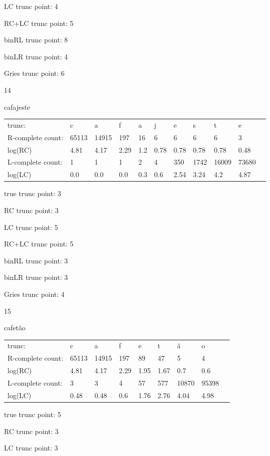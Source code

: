 \documentclass[10pt]{article}
\begin{document}
LC trunc point: 4

RC+LC trunc point: 5

binRL trunc point: 8

binLR trunc point: 4

Gries trunc point: 6

\vspace{1em}

14

cafajeste

\begin{tabular}{l|llllllllll}
trunc: & c & a & f & a & j & e & s & t & e & \\ 
R-complete count: & 65113 & 14915 & 197 & 16 & 6 & 6 & 6 & 6 & 3 & \\ 
log(RC) & 4.81 & 4.17 & 2.29 & 1.2 & 0.78 & 0.78 & 0.78 & 0.78 & 0.48 & \\ 
L-complete count: & 1 & 1 & 1 & 2 & 4 & 350 & 1742 & 16009 & 73680 & \\ 
log(LC) & 0.0 & 0.0 & 0.0 & 0.3 & 0.6 & 2.54 & 3.24 & 4.2 & 4.87 & \\ 
\end{tabular}

true trunc point: 3

RC trunc point: 3

LC trunc point: 5

RC+LC trunc point: 5

binRL trunc point: 3

binLR trunc point: 3

Gries trunc point: 4

\vspace{1em}

15

cafetão

\begin{tabular}{l|llllllll}
trunc: & c & a & f & e & t & ã & o & \\ 
R-complete count: & 65113 & 14915 & 197 & 89 & 47 & 5 & 4 & \\ 
log(RC) & 4.81 & 4.17 & 2.29 & 1.95 & 1.67 & 0.7 & 0.6 & \\ 
L-complete count: & 3 & 3 & 4 & 57 & 577 & 10870 & 95398 & \\ 
log(LC) & 0.48 & 0.48 & 0.6 & 1.76 & 2.76 & 4.04 & 4.98 & \\ 
\end{tabular}

true trunc point: 5

RC trunc point: 3

LC trunc point: 3
\end{document}
